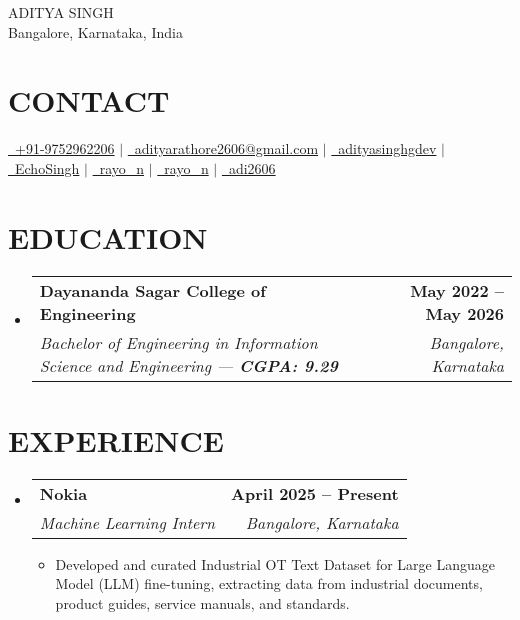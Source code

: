 \documentclass[letterpaper,10pt]{article}
\makeatletter
\newcommand{\resumeSubHeadingListStart}{\begin{itemize}[leftmargin=0.15in,label={}]}
\newcommand{\resumeSubHeadingListEnd}{\end{itemize}}
\newcommand{\resumeSubheading}[4]{%
  \item
  \begin{tabular*}{1.0\textwidth}[t]{l@{\extracolsep{\fill}}r}
    \textbf{#1} & {\small\bfseries #2} \\
    \textit{\color{primary} #3} & {\textit{\color{primary} #4}} \\
  \end{tabular*}\vspace{-2pt}
}
\newcommand{\resumeItemListStart}{\begin{itemize}[leftmargin=12pt]}
\newcommand{\resumeItemListEnd}{\end{itemize}}
\newcommand{\resumeItem}[1]{\item\small{#1}}
\makeatother
\begin{document}
\begin{center}
    {\Huge \scshape ADITYA SINGH} \\[6pt]
    \large Bangalore, Karnataka, India \\[8pt]
\end{center}

\section{CONTACT}
\begin{center}
\small
\href{tel:+919752962206}{\raisebox{-0.1\height}{\faPhone}\ +91-9752962206} $|$
\href{mailto:adityarathore2606@gmail.com}{\raisebox{-0.1\height}{\faEnvelope}\ adityarathore2606@gmail.com} $|$
\href{https://linkedin.com/in/adityasinghgdev}{\raisebox{-0.1\height}{\faLinkedin}\ adityasinghgdev} $|$
\href{https://github.com/EchoSingh}{\raisebox{-0.1\height}{\faGithub}\ EchoSingh} $|$
\href{https://leetcode.com/rayo_n}{\raisebox{-0.1\height}{\aiLeetcode}\ rayo\_n} $|$
\href{https://www.hackerrank.com/rayo_n}{\raisebox{-0.1\height}{\faHackerrank}\ rayo\_n} $|$
\href{https://www.kaggle.com/adi2606}{\raisebox{-0.1\height}{\faKaggle}\ adi2606} 
\end{center}


\section{EDUCATION}
\vspace{5 pt}
  \resumeSubHeadingListStart
    \resumeSubheading
      {Dayananda Sagar College of Engineering}{May 2022 -- May 2026}
      {Bachelor of Engineering in Information Science and Engineering --- \textbf{CGPA: 9.29}}{Bangalore, Karnataka}
  \resumeSubHeadingListEnd

\section{EXPERIENCE}
\vspace{5 pt}
  \resumeSubHeadingListStart
    \resumeSubheading
      {Nokia}{April 2025 -- Present}
      {Machine Learning Intern}{Bangalore, Karnataka}
      \resumeItemListStart
        \resumeItem{Developed and curated Industrial OT Text Dataset for Large Language Model (LLM) fine-tuning, extracting data from industrial documents, product guides, service manuals, and standards.}
      \resumeItemListEnd
  \resumeSubHeadingListEnd
\end{document}
